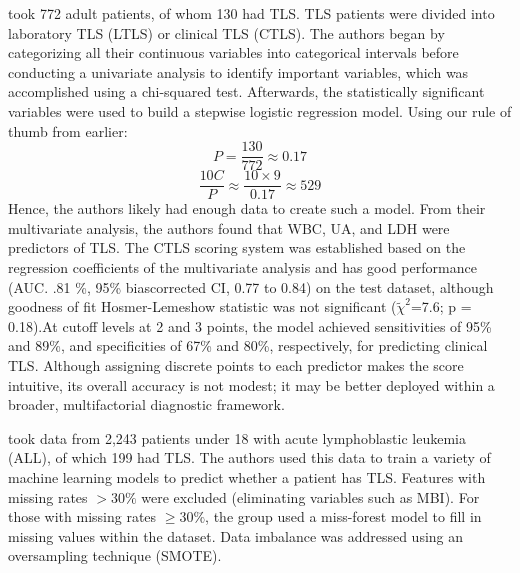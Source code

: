 \documentclass{article}
\begin{document}
\cite{mato2004predictive} took 772 adult patients, of whom 130 had TLS. TLS patients were divided into laboratory TLS (LTLS) or clinical TLS (CTLS). The authors began by categorizing all their continuous variables into categorical intervals before conducting a univariate analysis to identify important variables, which was accomplished using a chi-squared test. Afterwards, the statistically significant variables were used to build a stepwise logistic regression model. Using our rule of thumb from earlier:
\[P =\frac{130}{772} \approx 0.17 \]
\[ \frac{10C}{P} \approx \frac{10\times9}{0.17} \approx 529 \]
Hence, the authors likely had enough data to create such a model. From their multivariate analysis, the authors found that WBC, UA, and LDH were predictors of TLS. 
The CTLS scoring system was established based on the regression coefficients of the multivariate analysis and has good performance (AUC. .81 \%, 95\% bias\-corrected CI, 0.77 to 0.84) on the test dataset, although goodness of fit Hosmer-Lemeshow statistic was not significant (\(\tilde{\chi}^2\)=7.6; p = 0.18).At cut\-off levels at 2 and 3 points, the model achieved sensitivities of 95\% and 89\%, and specificities of 67\% and 80\%, respectively, for predicting clinical TLS. Although assigning discrete points to each predictor makes the score intuitive, its overall accuracy is not modest; it may be better deployed within a broader, multifactorial diagnostic framework.


\cite{xiao2024prediction} took data from 2,243 patients under 18 with acute lymphoblastic leukemia (ALL), of which 199 had TLS. The authors used this data to train a variety of machine learning models to predict whether a patient has TLS. Features with missing rates $> 30\%$ were excluded (eliminating variables such as MBI). For those with missing rates $\ge 30\%$, the group used a miss-forest model to fill in missing values within the dataset.  Data imbalance was addressed using an oversampling technique (SMOTE).
\end{document}
